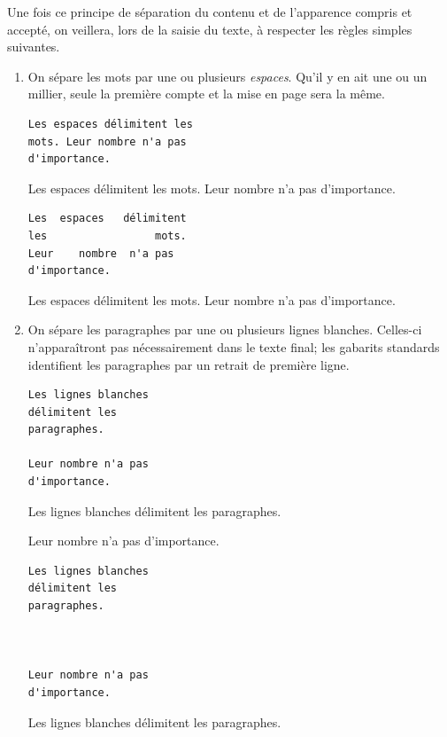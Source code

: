 Une fois ce principe de séparation du contenu et de l'apparence
compris et accepté, on veillera, lors de la saisie du texte, à
respecter les règles simples suivantes.
\begin{enumerate}
\item On sépare les mots par une ou plusieurs \emph{espaces}. Qu'il y
  en ait une ou un millier, seule la première compte et la mise en
  page sera la même.
  \begin{demo}
    \begin{texample}
\begin{lstlisting}
Les espaces délimitent les
mots. Leur nombre n'a pas
d'importance.
\end{lstlisting}
      \producing
      Les espaces délimitent les
      mots. Leur nombre n'a pas
      d'importance.
    \end{texample}
    \begin{texample}
\begin{lstlisting}[showstringspaces=true]
Les  espaces   délimitent
les                 mots.
Leur    nombre  n'a pas
d'importance.
\end{lstlisting}
      \producing
      Les  espaces   délimitent
      les                 mots.
      Leur    nombre  n'a pas
      d'importance.
    \end{texample}
  \end{demo}
%
\item On sépare les paragraphes par une ou plusieurs lignes blanches.
  Celles-ci n'apparaîtront pas nécessairement dans le texte final; les
  gabarits standards identifient les paragraphes par un retrait de
  première ligne.
  \begin{demo}
    \begin{texample}
\begin{lstlisting}
Les lignes blanches
délimitent les
paragraphes.

Leur nombre n'a pas
d'importance.
\end{lstlisting}
      \producing
Les lignes blanches
délimitent les
paragraphes.

        Leur nombre n'a pas
        d'importance.
    \end{texample}
\begin{texample}
\begin{lstlisting}
Les lignes blanches
délimitent les
paragraphes.



Leur nombre n'a pas
d'importance.
\end{lstlisting}
      \producing
        Les lignes blanches  délimitent
        les paragraphes.




\end{texample}
\end{demo}
\end{enumerate}
